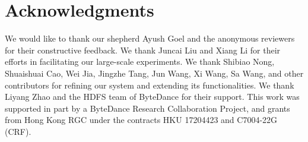 \section{Acknowledgments}\label{sec:ack}
We would like to thank our shepherd Ayush Goel and
the anonymous reviewers for their constructive feedback.
We thank Juncai Liu and Xiang Li for their efforts in facilitating our large-scale experiments.
We thank Shibiao Nong, Shuaishuai Cao, Wei Jia, Jingzhe Tang, Jun Wang, Xi Wang, Sa Wang, and other contributors for refining our system and extending its functionalities.
We thank Liyang Zhao and the HDFS team of ByteDance for their support.
This work was supported in part by a ByteDance Research Collaboration Project, and grants from Hong Kong RGC under the contracts HKU 17204423 and C7004-22G (CRF).
